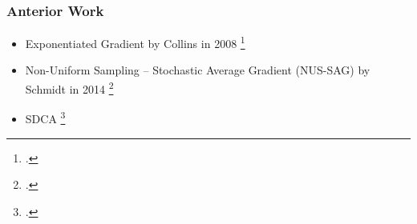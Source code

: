 \documentclass{beamer}
\DeclareMathOperator{\1}{\mathbb{1}}
\begin{document}
\begin{frame}[fragile]
	\frametitle{Anterior Work}
	\begin{itemize}
		\item Exponentiated Gradient by Collins in 2008 \footcite{collins_exponentiated_2008}
		\item Non-Uniform Sampling -- Stochastic Average Gradient (NUS-SAG) by Schmidt in 2014 \footcite{schmidt_non-uniform_2015}
		\item SDCA \footcite{shalev-shwartz_accelerated_2013-1}
	\end{itemize}


\begin{center}
	\bigskip
	\bigskip
\end{center}




\end{frame}
%
%
%
%
%
%
%
\end{document}
